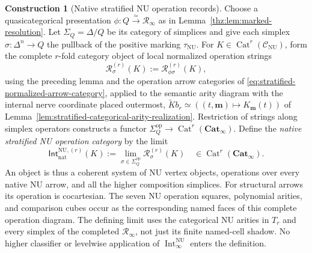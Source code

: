 \documentclass[oneside]{article}
\theoremstyle{plain}
\theoremstyle{definition}
\newtheorem{construction}[theorem]{Construction}
\theoremstyle{remark}
\newcommand{\CNU}{\mathcal C_{\mathrm{NU}}}
\newcommand{\Cat}{\mathbf{Cat}_{\infty}}
\newcommand{\Int}{\operatorname{Int}}
\newcommand{\NU}{\mathrm{NU}}
\newcommand{\RNU}{\mathcal R_{\infty}}
\newcommand{\op}{\mathrm{op}}
\begin{document}
\begin{construction}[Native stratified NU operation records]
\label{con:stratified-native-records}
Choose a quasicategorical presentation
$\phi:Q\xrightarrow{\simeq}\RNU$ as in
Lemma~\ref{thz:lem:marked-resolution}.  Let
$\Sigma_Q=\Delta/Q$ be its category of simplices and give each
simplex $\sigma:\Delta^n\to Q$ the pullback of the positive
marking $\tau_{\NU}$.  For
$K\in\operatorname{Cat}^r(\CNU)$, form the complete
$r$-fold category object of local normalized operation strings
\[
 \mathscr R^{(r)}_{\sigma}(K)
 :=\mathscr R^{(r)}_{\phi\sigma}(K),
\]
using the preceding lemma and the operation arrow categories of
\eqref{eq:stratified-normalized-arrow-category}, applied to the
semantic arity diagram with the internal nerve
coordinate placed outermost, $\widetilde K b_r\simeq((t,\mathbf m)\mapsto K_{\mathbf m}(t))$
of Lemma~\ref{lem:stratified-categorical-arity-realization}.  Restriction of
strings along simplex operators constructs a functor
$\Sigma_Q^{\op}\to\operatorname{Cat}^r(\Cat)$.  Define the
\emph{native stratified NU operation category} by the limit
\begin{equation}\label{eq:stratified-native-sections}
 \mathsf{Int}^{\NU,(r)}_{\mathrm{nat}}(K)
 :=\lim_{\sigma\in\Sigma_Q^{\op}}
          \mathscr R^{(r)}_{\sigma}(K)
 \quad\in\operatorname{Cat}^r(\Cat).
\end{equation}
An object is thus a coherent system of NU vertex objects, operations
over every native NU arrow, and all the higher composition simplices.
For structural arrows its operation is cocartesian.  The seven NU
operation squares, polynomial arities, and comparison cubes occur as
the corresponding named faces of this complete operation diagram.
The defining limit uses the categorical NU arities in $T_r$ and
every simplex of the completed $\RNU$, not just its finite
named-cell shadow.  No higher classifier or
levelwise application of $\Int^{\NU}_\infty$ enters the definition.
\end{construction}
\end{document}
